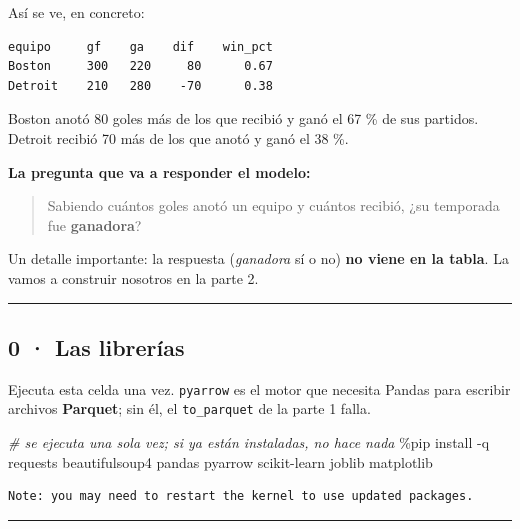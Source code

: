 \documentclass[
]{article}
\newenvironment{Shaded}{}{}
\newcommand{\CommentTok}[1]{\textcolor[rgb]{0.38,0.63,0.69}{\textit{#1}}}
\newcommand{\NormalTok}[1]{#1}
\newcommand{\OperatorTok}[1]{\textcolor[rgb]{0.40,0.40,0.40}{#1}}
\begin{document}
Así se ve, en concreto:

\begin{verbatim}
equipo     gf    ga    dif    win_pct
Boston     300   220     80      0.67
Detroit    210   280    -70      0.38
\end{verbatim}

Boston anotó 80 goles más de los que recibió y ganó el 67 \% de sus
partidos. Detroit recibió 70 más de los que anotó y ganó el 38 \%.

\textbf{La pregunta que va a responder el modelo:}

\begin{quote}
Sabiendo cuántos goles anotó un equipo y cuántos recibió, ¿su temporada
fue \textbf{ganadora}?
\end{quote}

Un detalle importante: la respuesta (\emph{ganadora} sí o no) \textbf{no
viene en la tabla}. La vamos a construir nosotros en la parte 2.

\protect{}\label{0pRQ7sVjnYyB}
\begin{center}\rule{0.5\linewidth}{0.5pt}\end{center}

\subsection{0 · Las librerías}\label{0--las-libreruxedas}

Ejecuta esta celda una vez. \texttt{pyarrow} es el motor que necesita
Pandas para escribir archivos \textbf{Parquet}; sin él, el
\texttt{to\_parquet} de la parte 1 falla.

\protect{}\label{l2ew8ZjinYyB}
\begin{Shaded}
\begin{Highlighting}[]
\CommentTok{\# se ejecuta una sola vez; si ya están instaladas, no hace nada}
\OperatorTok{\%}\NormalTok{pip install }\OperatorTok{{-}}\NormalTok{q requests beautifulsoup4 pandas pyarrow scikit}\OperatorTok{{-}}\NormalTok{learn joblib matplotlib}
\end{Highlighting}
\end{Shaded}

\begin{verbatim}
Note: you may need to restart the kernel to use updated packages.
\end{verbatim}

\protect{}\label{9CNEWlc3nYyD}
\begin{center}\rule{0.5\linewidth}{0.5pt}\end{center}
\end{document}
